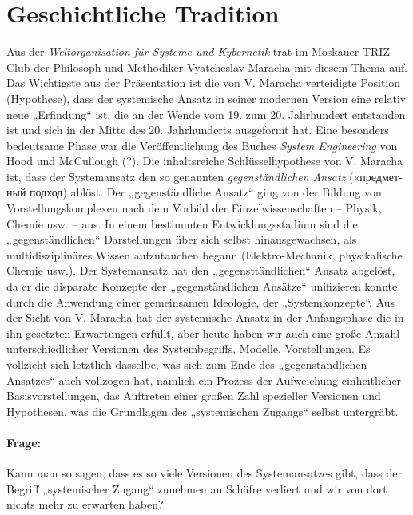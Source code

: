 \documentclass[11pt,a4paper]{article}
\begin{document}
\section{Geschichtliche Tradition}
Aus der \emph{Weltorganisation für Systeme und Kybernetik} trat im Moskauer
TRIZ-Club der Philosoph und Methodiker Vyatcheslav Maracha mit diesem Thema
auf. Das Wichtigste aus der Präsentation ist die von V. Maracha verteidigte
Position (Hypothese), dass der systemische Ansatz in seiner modernen Version
eine relativ neue „Erfindung“ ist, die an der Wende vom 19. zum
20. Jahrhundert entstanden ist und sich in der Mitte des 20. Jahrhunderts
ausgeformt hat. Eine besonders bedeutsame Phase war die Veröffentlichung des
Buches \emph{System Engineering} von Hood und McCullough (?).  Die
inhaltsreiche Schlüsselhypothese von V. Maracha ist, dass der Systemansatz den
so genannten \emph{gegenständlichen Ansatz}
(\foreignlanguage{russian}{«предметный подход}) ablöst.  Der „gegenständliche
Ansatz“ ging von der Bildung von Vorstellungskomplexen nach dem Vorbild der
Einzelwissenschaften -- Physik, Chemie usw. -- aus. In einem bestimmten
Entwicklungsstadium sind die „gegenständlichen“ Darstellungen über sich selbst
hinausgewachsen, als multidisziplinäres Wissen aufzutauchen begann
(Elektro-Mechanik, physikalische Chemie usw.). Der Systemansatz hat den
„gegensttändlichen“ Ansatz abgelöst, da er die disparate Konzepte der
„gegenständlichen Ansätze“ unifizieren konnte durch die Anwendung einer
gemeinsamen Ideologie, der „Systemkonzepte“. Aus der Sicht von V. Maracha hat
der systemische Ansatz in der Anfangsphase die in ihn gesetzten Erwartungen
erfüllt, aber heute haben wir auch eine große Anzahl unterschiedlicher
Versionen des Systembegriffs, Modelle, Vorstellungen.  Es vollzieht sich
letztlich dasselbe, was sich zum Ende des „gegenständlichen Ansatzes“ auch
vollzogen hat, nämlich ein Prozess der Aufweichung einheitlicher
Basisvorstellungen, das Auftreten einer großen Zahl spezieller Versionen und
Hypothesen, was die Grundlagen des „systemischen Zugangs“ selbst untergräbt.

\paragraph{Frage:}
Kann man so sagen, dass es so viele Versionen des Systemansatzes gibt, dass
der Begriff „systemischer Zugang“ zunehmen an Schäfre verliert und wir von
dort nichts mehr zu erwarten haben?
\end{document}
